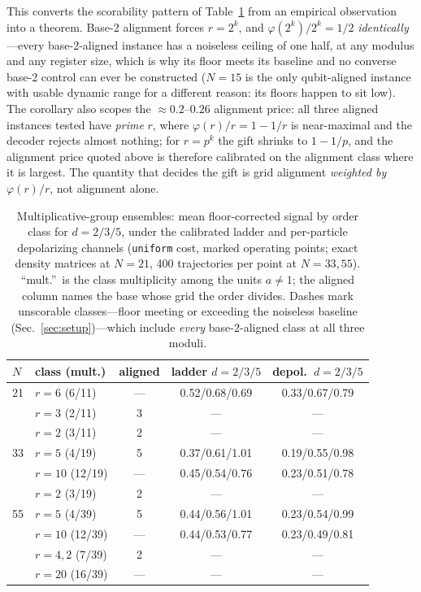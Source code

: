 \documentclass[aps,pra,reprint,superscriptaddress,nofootinbib,floatfix]{revtex4-2}
\begin{document}
This converts the scorability pattern of Table~\ref{tab:ensemble}
from an empirical observation into a theorem. Base-2 alignment forces
$r=2^k$, and $\varphi(2^k)/2^k=1/2$ \emph{identically}---every
base-2-aligned instance has a noiseless ceiling of one half, at any
modulus and any register size, which is why its floor meets its
baseline and no converse base-2 control can ever be constructed
($N=15$ is the only qubit-aligned instance with usable dynamic range
for a different reason: its floors happen to sit low). The corollary
also scopes the ${\approx}0.2$--$0.26$ alignment price: all three aligned
instances tested have \emph{prime} $r$, where
$\varphi(r)/r=1-1/r$ is near-maximal and the decoder rejects almost
nothing; for $r=p^k$ the gift shrinks to $1-1/p$, and the alignment
price quoted above is therefore calibrated on the alignment class
where it is largest. The quantity that decides the gift is grid
alignment \emph{weighted by} $\varphi(r)/r$, not alignment alone.

\begin{table}[t]
\caption{Multiplicative-group ensembles: mean floor-corrected signal
by order class for $d=2/3/5$, under the calibrated ladder and
per-particle depolarizing channels (\texttt{uniform} cost, marked
operating points; exact density matrices at $N=21$, 400 trajectories
per point at $N=33,55$). ``mult.''\ is the class multiplicity among
the units $a\neq1$; the aligned column names the base whose grid the
order divides. Dashes mark unscorable classes---floor meeting or
exceeding the noiseless baseline (Sec.~\ref{sec:setup})---which
include \emph{every} base-2-aligned class at all three moduli.}
\label{tab:ensemble}
\begin{ruledtabular}
\begin{tabular}{llccc}
$N$ & class (mult.) & aligned & ladder $d{=}2/3/5$ & depol.\ $d{=}2/3/5$ \\
\hline
21 & $r{=}6$ (6/11)   & ---  & 0.52/0.68/0.69 & 0.33/0.67/0.79 \\
   & $r{=}3$ (2/11)   & 3    & ---            & ---            \\
   & $r{=}2$ (3/11)   & 2    & ---            & ---            \\
33 & $r{=}5$ (4/19)   & 5    & 0.37/0.61/1.01 & 0.19/0.55/0.98 \\
   & $r{=}10$ (12/19) & ---  & 0.45/0.54/0.76 & 0.23/0.51/0.78 \\
   & $r{=}2$ (3/19)   & 2    & ---            & ---            \\
55 & $r{=}5$ (4/39)   & 5    & 0.44/0.56/1.01 & 0.23/0.54/0.99 \\
   & $r{=}10$ (12/39) & ---  & 0.44/0.53/0.77 & 0.23/0.49/0.81 \\
   & $r{=}4,2$ (7/39) & 2    & ---            & ---            \\
   & $r{=}20$ (16/39) & ---  & ---            & ---            \\
\end{tabular}
\end{ruledtabular}
\end{table}
\end{document}
